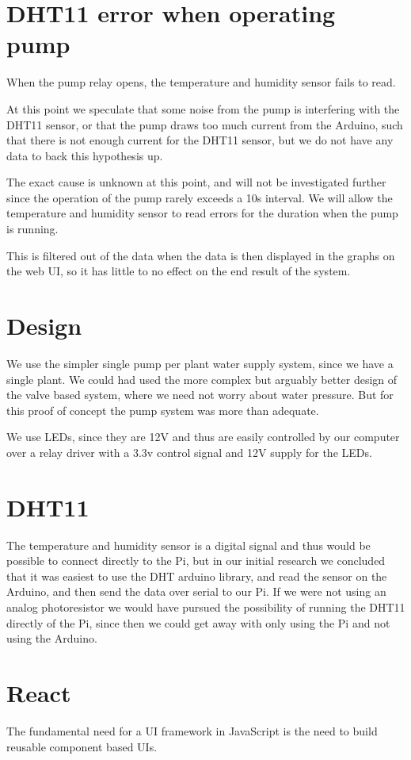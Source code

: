 \documentclass[a4paper,12pt,twoside,openright,titlepage]{book}
\begin{document}
\section{DHT11 error when operating pump}
When the pump relay opens, the temperature and humidity sensor fails to read.

At this point we speculate that some noise from the pump is interfering with the DHT11 sensor, or that the pump draws too much current from the Arduino, such that there is not enough current for the DHT11 sensor, but we do not have any data to back this hypothesis up.

The exact cause is unknown at this point, and will not be investigated further since the operation of the pump rarely exceeds a 10s interval. We will allow the temperature and humidity sensor to read errors for the duration when the pump is running.

This is filtered out of the data when the data is then displayed in the graphs on the web UI, so it has little to no effect on the end result of the system.

\section{Design}
We use the simpler single pump per plant water supply system, since we have a single plant.
We could had used the more complex but arguably better design of the valve based system, where we need not worry about water pressure. But for this proof of concept the pump system was more than adequate.

We use LEDs, since they are 12V and thus are easily controlled by our computer over a relay driver with a 3.3v control signal and 12V supply for the LEDs.

\section{DHT11}
The temperature and humidity sensor is a digital signal and thus would be possible to connect directly to the Pi, but in our initial research we concluded that it was easiest to use the DHT arduino library, and read the sensor on the Arduino, and then send the data over serial to our Pi. If we were not using an analog photoresistor we would have pursued the possibility of running the DHT11 directly of the Pi, since then we could get away with only using the Pi and not using the Arduino.

\section{React}
The fundamental need for a UI framework in JavaScript is the need to build reusable component based UIs.
\end{document}
